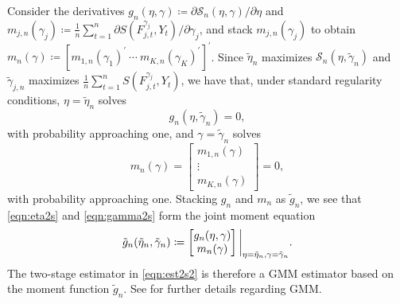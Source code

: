 \documentclass[12pt]{article}
\theoremstyle{definition}
\theoremstyle{remark}
\begin{document}
Consider the derivatives $g_{n}(\eta, \gamma) \coloneqq  \partial \mathcal{S}_{n}(\eta, \gamma)/\partial \eta$ and $m_{j,n}(\gamma_j) \coloneqq \frac{1}{n} \sum_{t = 1}^{n} \partial S(F^{\gamma_j}_{j,t}, Y_{t})/\partial \gamma_j$, and stack $m_{j,n}(\gamma_j)$ to obtain $m_{n}(\gamma) \coloneqq [ m_{1,n}(\gamma_1)^{\prime}\ \cdots\ m_{K,n}(\gamma_K)^{\prime} ]^{\prime}$. Since $\tilde{\eta}_{n}$ maximizes $\mathcal{S}_{n}(\eta, \tilde{\gamma}_n)$ and $\tilde{\gamma}_{j,n}$ maximizes $\frac{1}{n} \sum_{t = 1}^{n} S(F^{\gamma_j}_{j,t}, Y_{t})$, we have that, under standard regularity conditions, $\eta = \tilde{\eta}_{n}$ solves 
\begin{equation}
g_{n}(\eta, \tilde{\gamma}_{n}) = 0,  \label{eqn:eta2s}
\end{equation}
with probability approaching one, and $\gamma = \tilde{\gamma}_{n}$ solves 
\begin{equation}
m_{n}(\gamma) = \begin{bmatrix} m_{1,n}(\gamma) \\ \vdots \\ m_{K,n}(\gamma) \end{bmatrix} = 0,  \label{eqn:gamma2s}
\end{equation}
with probability approaching one. Stacking $g_{n}$ and $m_{n}$ as $\tilde{g}_{n}$, we see that \eqref{eqn:eta2s} and \eqref{eqn:gamma2s} form the joint moment equation 
\begin{equation*}
\tilde{g}_{n}(\tilde{\eta}_{n}, \tilde{\gamma}_{n}) \coloneqq \begin{bmatrix} g_{n}(\eta, \gamma) \\ m_{n}(\gamma) \end{bmatrix} \bigg{|}_{\eta = \tilde{\eta}_{n}, \gamma = \tilde{\gamma}_{n}}.
\end{equation*}
The two-stage estimator in \eqref{eqn:est2s2} is therefore a GMM estimator based on the moment function $\tilde{g}_{n}$. See  for further details regarding GMM.
\end{document}

